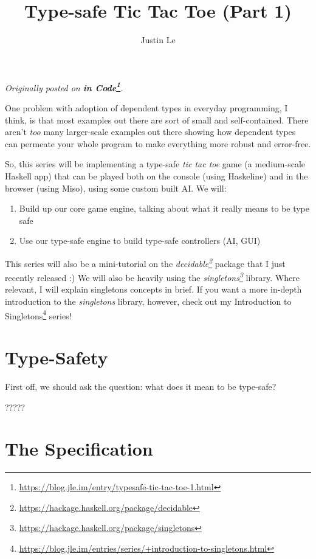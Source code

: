 \documentclass[]{article}
\title{Type-safe Tic Tac Toe (Part 1)}
\author{Justin Le}
\renewcommand{\href}[2]{#2\footnote{\url{#1}}}
\begin{document}
\maketitle

\emph{Originally posted on
\textbf{\href{https://blog.jle.im/entry/typesafe-tic-tac-toe-1.html}{in Code}}.}

One problem with adoption of dependent types in everyday programming, I think,
is that most examples out there are sort of small and self-contained. There
aren't \emph{too} many larger-scale examples out there showing how dependent
types can permeate your whole program to make everything more robust and
error-free.

So, this series will be implementing a type-safe \emph{tic tac toe} game (a
medium-scale Haskell app) that can be played both on the console (using
Haskeline) and in the browser (using Miso), using some custom built AI. We will:

\begin{enumerate}
\def\labelenumi{\arabic{enumi}.}
\tightlist
\item
  Build up our core game engine, talking about what it really means to be type
  safe
\item
  Use our type-safe engine to build type-safe controllers (AI, GUI)
\end{enumerate}

This series will also be a mini-tutorial on the
\emph{\href{https://hackage.haskell.org/package/decidable}{decidable}} package
that I just recently released :) We will also be heavily using the
\emph{\href{https://hackage.haskell.org/package/singletons}{singletons}}
library. Where relevant, I will explain singletons concepts in brief. If you
want a more in-depth introduction to the \emph{singletons} library, however,
check out my
\href{https://blog.jle.im/entries/series/+introduction-to-singletons.html}{Introduction
to Singletons} series!

\hypertarget{type-safety}{%
\section{Type-Safety}\label{type-safety}}

First off, we should ask the question: what does it mean to be type-safe?

?????

\hypertarget{the-specification}{%
\section{The Specification}\label{the-specification}}
\end{document}
